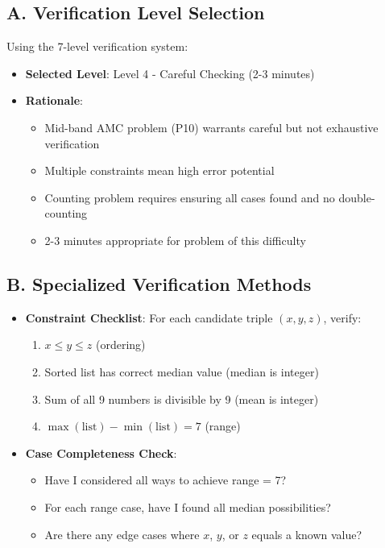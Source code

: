 \documentclass[11pt]{article}
\begin{document}
\begin{verificationbox}
\subsection*{A. Verification Level Selection}

Using the 7-level verification system:

\begin{itemize}[leftmargin=*]
    \item \textbf{Selected Level}: Level 4 - Careful Checking (2-3 minutes)
    \item \textbf{Rationale}: 
    \begin{itemize}
        \item Mid-band AMC problem (P10) warrants careful but not exhaustive verification
        \item Multiple constraints mean high error potential
        \item Counting problem requires ensuring all cases found and no double-counting
        \item 2-3 minutes appropriate for problem of this difficulty
    \end{itemize}
\end{itemize}

\subsection*{B. Specialized Verification Methods}
\begin{itemize}[leftmargin=*]
    \item \textbf{Constraint Checklist}: For each candidate triple $(x, y, z)$, verify:
    \begin{enumerate}
        \item $x \leq y \leq z$ \quad (ordering)
        \item Sorted list has correct median value \quad (median is integer)
        \item Sum of all 9 numbers is divisible by 9 \quad (mean is integer)
        \item $\max(\text{list}) - \min(\text{list}) = 7$ \quad (range)
    \end{enumerate}
    
    \item \textbf{Case Completeness Check}:
    \begin{itemize}
        \item Have I considered all ways to achieve range = 7?
        \item For each range case, have I found all median possibilities?
        \item Are there any edge cases where $x$, $y$, or $z$ equals a known value?
    \end{itemize}
    

\end{itemize}
\end{verificationbox}
\end{document}
